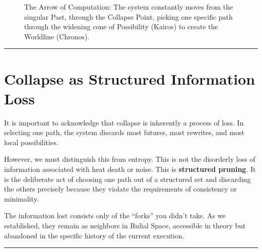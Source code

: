 \begin{figure}[h]
\centering
{}
\caption{The Arrow of Computation: The system constantly moves from the singular Past, through the Collapse Point, picking one specific path through the widening cone of Possibility (Kairos) to create the Worldline (Chronos).}
\end{figure}

\begin{center}\rule{0.5\linewidth}{0.5pt}\end{center}

\section{\texorpdfstring{\textbf{Collapse as Structured Information Loss}}{13.8 --- Collapse as Structured Information Loss}}

It is important to acknowledge that collapse is inherently a process of loss. In selecting one path, the system discards most futures, most rewrites, and most local possibilities.

However, we must distinguish this from entropy. This is not the disorderly loss of information associated with heat death or noise. This is \textbf{structured pruning}. It is the deliberate act of choosing one path out of a structured set and discarding the others precisely because they violate the requirements of consistency or minimality.

The information lost consists only of the ``forks'' you didn't take. As we established, they remain as neighbors in Rulial Space, accessible in theory but abandoned in the specific history of the current execution.

\begin{center}\rule{0.5\linewidth}{0.5pt}\end{center}

